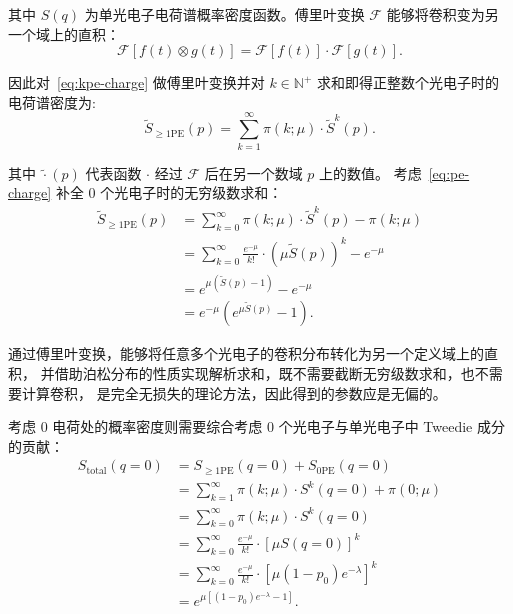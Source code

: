 其中 $S(q)$ 为单光电子电荷谱概率密度函数。傅里叶变换 $\mathcal{F}$ 能够将卷积变为另一个域上的直积：
\begin{equation}
    \mathcal{F}\left[f(t)\otimes g(t)\right]=\mathcal{F}[f(t)]\cdot\mathcal{F}[g(t)].
    \label{eq:fourier}
\end{equation}

因此对~\eqref{eq:kpe-charge} 做傅里叶变换并对 $k\in\mathbb{N}^{+}$ 求和即得正整数个光电子时的电荷谱密度为:
\begin{equation}
    \tilde{S}_{\ge1\text{PE}}(p)=\sum_{k=1}^{\infty}
    \pi(k;\mu)\cdot\tilde{S}^k(p).
    \label{eq:pe-charge}
\end{equation}

其中 $\tilde{\cdot}(p)$ 代表函数 $\cdot$ 经过 $\mathcal{F}$ 后在另一个数域 ${p}$ 上的数值。
考虑~\eqref{eq:pe-charge} 补全 0 个光电子时的无穷级数求和：
\begin{equation}
    \begin{aligned}
        \tilde{S}_{\ge1\text{PE}}(p)
        &=\sum_{k=0}^{\infty}\pi(k;\mu)\cdot\tilde{S}^k(p)-\pi(k;\mu)\\
        &=\sum_{k=0}^{\infty}\frac{e^{-\mu}}{k!}\cdot\left(\mu\tilde{S}(p)\right)^k-e^{-\mu}\\
        &=e^{\mu(\tilde{S}(p)-1)}-e^{-\mu}\\
        &=e^{-\mu}(e^{\mu\tilde{S}(p)}-1).
    \end{aligned}
    \label{eq:postive-charge}
\end{equation}

通过傅里叶变换，能够将任意多个光电子的卷积分布转化为另一个定义域上的直积，
并借助泊松分布的性质实现解析求和，既不需要截断无穷级数求和，也不需要计算卷积，
是完全无损失的理论方法，因此得到的参数应是无偏的。

考虑 0 电荷处的概率密度则需要综合考虑 0 个光电子与单光电子中 Tweedie 成分的贡献：
\begin{equation}
    \begin{aligned}
        S_{\text{total}}(q=0)
        &=S_{\ge1\text{PE}}(q=0)+S_{0\text{PE}}(q=0)\\
        &=\sum_{k=1}^{\infty}\pi(k;\mu)\cdot S^k(q=0)+\pi(0;\mu)\\
        &=\sum_{k=0}^{\infty}\pi(k;\mu)\cdot S^k(q=0)\\
        &=\sum_{k=0}^{\infty}\frac{e^{-\mu}}{k!}\cdot\left[\mu S(q=0)\right]^k\\
        &=\sum_{k=0}^{\infty}\frac{e^{-\mu}}{k!}\cdot\left[\mu(1-p_0)e^{-\lambda}\right]^k\\
        &=e^{\mu\left[(1-p_0)e^{-\lambda}-1\right]}.
    \end{aligned}
    \label{eq:zero-charge}
\end{equation}

